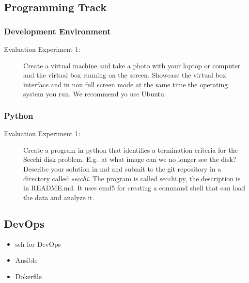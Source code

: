 \subsection{Programming Track}

\subsubsection{Development Environment}



\begin{description}
\item[Evaluation Experiment 1:] Create a virtual machine and take a
  photo with your laptop or computer and the virtual box running on
  the screen. Showcase the virtual box interface and in non full
  screen mode at the same time the operating system you run. We
  recommend yo use Ubuntu.
\end{description}

\subsubsection{Python}



\begin{description}
\item[Evaluation Experiment 1:] Create a program in python that
  identifies a termination criteria for the Secchi disk
  problem. E.g.\ at what image can we no longer see the disk?
  Describe your solution in md and submit to the git repository in a
  directory called \textit{secchi}. The program is called secchi.py, the
  description is in README.md. It uses cmd5 for creating a command
  shell that can load the data and analyze it. 
\end{description}

\subsection{DevOps}

\begin{itemize}
\item ssh for DevOps
\item Ansible
\item Dokerfile
\end{itemize}

